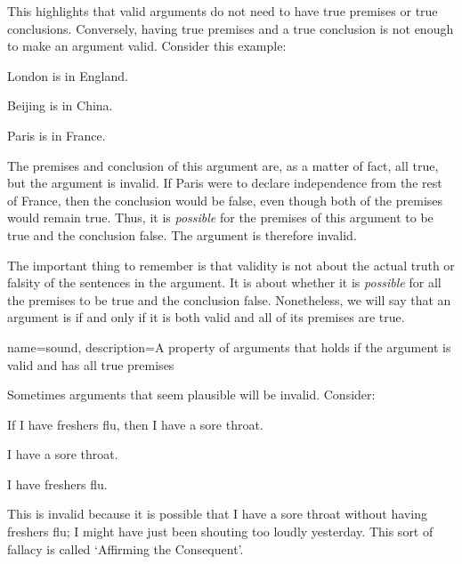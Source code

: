 This highlights that valid arguments do not need to have true premises or true conclusions. Conversely, having true premises and a true conclusion is not enough to make an argument valid. Consider this example:
	\begin{earg}
		\item[] London is in England.
		\item[] Beijing is in China.
		\item[\therefore] Paris is in France.
	\end{earg}
The premises and conclusion of this argument are, as a matter of fact, all true, but the argument is invalid. If Paris were to declare independence from the rest of France, then the conclusion would be false, even though both of the premises would remain true. Thus, it is \emph{possible} for the premises of this argument to be true and the conclusion false. The argument is therefore invalid.

The important thing to remember is that validity is not about the actual truth or falsity of the sentences in the argument. It is about whether it is \emph{possible} for all the premises to be true and the conclusion false. Nonetheless, we will say that an argument is  if and only if it is both valid and all of its premises are true.

{
name=sound,
description={A property of arguments that holds if the argument is valid and has all true premises}
}

Sometimes arguments that seem plausible will be invalid. Consider:
\begin{earg}
\item[]	If I have freshers flu, then I have a sore throat.
\item[]	I have a sore throat.
\item[\therefore]	I have freshers flu.
\end{earg}
This is invalid because it is possible that I have a sore throat without having freshers flu; I might have just been shouting too loudly yesterday. This sort of fallacy is called `Affirming the Consequent'.


